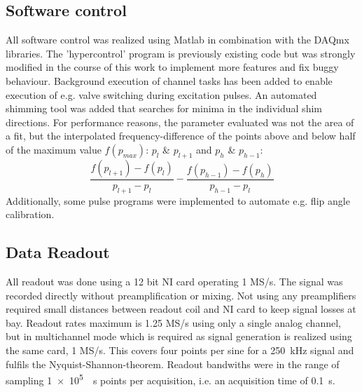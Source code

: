         \subsection{Software control}
            All software control was realized using Matlab in combination with the DAQmx libraries. The 'hypercontrol' program is previously existing code but was strongly modified in the course of this work to implement more features and fix buggy behaviour. Background execution of channel tasks has been added to enable execution of e.g. valve switching during excitation pulses. An automated shimming tool was added that searches for minima in the individual shim directions. For performance reasons, the parameter evaluated was not the area of a fit, but the interpolated frequency-difference of the points above and below half of the maximum value $f(p_{max})$: $p_l$ \& $p_{l+1}$ and $p_h$ \& $p_{h-1}$:
            \begin{equation}
                \frac{f(p_{l+1})-f(p_l)}{p_{l+1} - p_l}-\frac{f(p_{h-1})-f(p_h)}{p_{h-1} - p_l}
            \end{equation}
            Additionally, some pulse programs were implemented to automate e.g. flip angle calibration.
        \subsection{Data Readout}
            All readout was done using a 12 bit NI  card operating 1 MS/s. The signal was recorded directly without preamplification or mixing. Not using any preamplifiers required small distances between readout coil and NI card to keep signal losses at bay. Readout rates maximum is 1.25 MS/s using only a single analog channel, but in multichannel mode which is required as signal generation is realized using the same card, 1 MS/s. This covers four points per sine for a \SI{250}{\kilo\hertz} signal and fulfils the Nyquist-Shannon-theorem. Readout bandwiths were in the range of  sampling \SI{1e5}{\per\second} points per acquisition, i.e. an acquisition time of \SI{0.1}{\second}.
